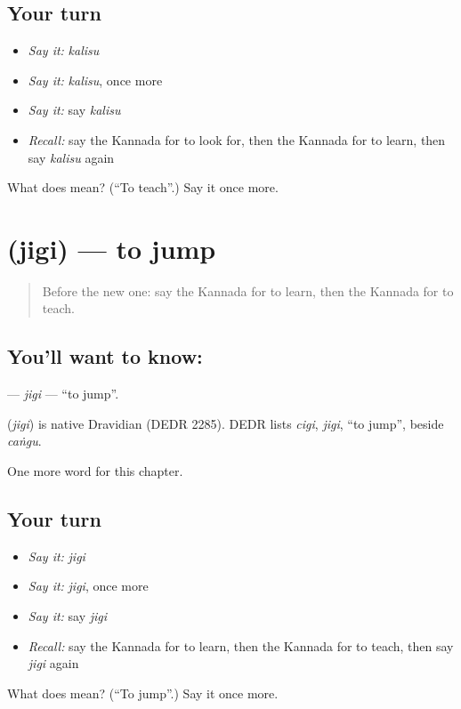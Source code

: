 \subsection*{Your turn}
\begin{itemize}
\raggedright
  \item \emph{Say it:} \emph{kalisu}
  \item \emph{Say it:} \emph{kalisu}, once more
  \item \emph{Say it:} say \emph{kalisu}
  \item \emph{Recall:} say the Kannada for to look for, then the Kannada for to learn, then say \emph{kalisu} again
\end{itemize}

\begin{tcolorbox}[breakable,colback=teal!4,colframe=teal!35!black,title={Before you move on}]
What does  mean? (\textquotedblleft{}To teach\textquotedblright{}.) Say it once more.
\end{tcolorbox}
\section[\texorpdfstring{\kn{ಜಿಗಿ} (jigi)}{ಜಿಗಿ (jigi)}]{ (jigi) — to jump}

\label{lesson:KA-C148-jigi}



\begin{quote}
Before the new one: say the Kannada for to learn, then the Kannada for to teach.
\end{quote}

\subsection*{You'll want to know: }
\textbf{} — \emph{jigi} — \textquotedblleft{}to jump\textquotedblright{}.

\begin{cousinweb}
\textbf{} (\emph{jigi}) is native Dravidian (DEDR 2285). DEDR lists \emph{cigi}, \emph{jigi}, \textquotedblleft{}to jump\textquotedblright{}, beside \emph{caṅgu}.
\end{cousinweb}

\begin{grammarlens}[title={What you've built}]
One more word for this chapter.
\end{grammarlens}

\subsection*{Your turn}
\begin{itemize}
\raggedright
  \item \emph{Say it:} \emph{jigi}
  \item \emph{Say it:} \emph{jigi}, once more
  \item \emph{Say it:} say \emph{jigi}
  \item \emph{Recall:} say the Kannada for to learn, then the Kannada for to teach, then say \emph{jigi} again
\end{itemize}

\begin{tcolorbox}[breakable,colback=teal!4,colframe=teal!35!black,title={Before you move on}]
What does  mean? (\textquotedblleft{}To jump\textquotedblright{}.) Say it once more.
\end{tcolorbox}
